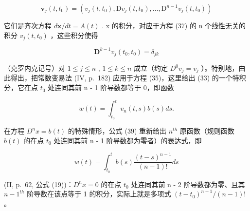 \[
\mathbf {v} _ {j} (t, t _ {0}) = (v _ {j} (t, t _ {0}), \mathrm{D} v _ {j} (t, t _ {0}), \dots , \mathrm{D} ^ {n - 1} v _ {j} (t, t _ {0}))
\]

它们是齐次方程 \(d\mathbf{x}/dt = A(t)\) . x 的积分，对应于方程 (37) 的 n 个线性无关的积分 \(v_{j}(t, t_{0})\) ，这些积分使得

\[
\mathbf {D} ^ {k - 1} v _ {j} (t _ {0}, t _ {0}) = \delta_ {j k}
\]

（克罗内克记号）对 \(1 \leqslant j \leqslant n\) , \(1 \leqslant k \leqslant n\) 成立（约定 \(D^{0}v_{j} = v_{j}\) ）。特别地，由此得出，把常数变易法 (IV, p.~182) 应用于方程 (35)，这里给出 (33) 的一个特积分，它在点 \(t_{0}\) 处连同其前 n - 1 阶导数都等于 0，即函数

\[
w (t) = \int_ {t _ {0}} ^ {t} v _ {n} (t, s) b (s) d s.\tag{39}
\]

在方程 \(D^{n}x = b(t)\) 的特殊情形，公式 (39) 重新给出 \(n^{th}\) 原函数（规则函数 \(b(t)\) 的在点 \(t_{0}\) 处连同其前 n - 1 阶导数都为零者）的表达式，即

\[
w (t) = \int_ {t _ {0}} ^ {t} b (s) \frac {(t - s) ^ {n - 1}}{(n - 1) !} d s
\]

(II, p.~62, 公式 (19))：\(D^{n}x = 0\) 的在点 \(t_{0}\) 处连同其前 n - 2 阶导数都为零、且其 \(n - 1^{th}\) 阶导数在该点等于 1 的积分，实际上就是多项式 \((t - t_{0})^{n-1}/(n - 1)!\) 。


